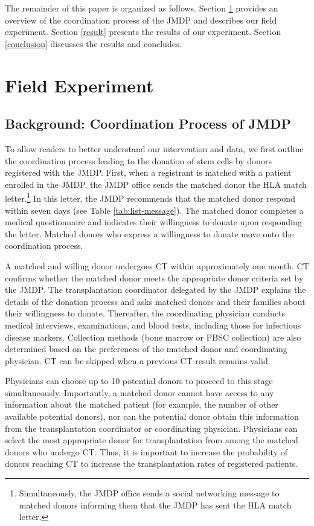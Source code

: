 \documentclass[12pt, a4paper]{article}
\begin{document}
The remainder of this paper is organized as follows. Section \ref{experiment} provides an overview of the coordination process of the JMDP and describes our field experiment. Section \ref{result} presents the results of our experiment. Section \ref{conclusion} discusses the results and concludes.

\section{Field Experiment}\label{experiment}

\subsection{Background: Coordination Process of JMDP}\label{background}

To allow readers to better understand our intervention and data, we first outline the coordination process leading to the donation of stem cells by donors registered with the JMDP. First, when a registrant is matched with a patient enrolled in the JMDP, the JMDP office sends the matched donor the HLA match letter.\footnote{Simultaneously, the JMDP office sends a social networking message to matched donors informing them that the JMDP has sent the HLA match letter.} In this letter, the JMDP recommends that the matched donor respond within seven days (see Table \ref{tab:list-message}). The matched donor completes a medical questionnaire and indicates their willingness to donate upon responding the letter. Matched donors who express a willingness to donate move onto the coordination process.

A matched and willing donor undergoes CT within approximately one month. CT confirms whether the matched donor meets the appropriate donor criteria set by the JMDP. The transplantation coordinator delegated by the JMDP explains the details of the donation process and asks matched donors and their families about their willingness to donate. Thereafter, the coordinating physician conducts medical interviews, examinations, and blood tests, including those for infectious disease markers. Collection methods (bone marrow or PBSC collection) are also determined based on the preferences of the matched donor and coordinating physician. CT can be skipped when a previous CT result remains valid.

Physicians can choose up to 10 potential donors to proceed to this stage simultaneously. Importantly, a matched donor cannot have access to any information about the matched patient (for example, the number of other available potential donors), nor can the potential donor obtain this information from the transplantation coordinator or coordinating physician. Physicians can select the most appropriate donor for transplantation from among the matched donors who undergo CT. Thus, it is important to increase the probability of donors reaching CT to increase the transplantation rates of registered patients.
\end{document}
